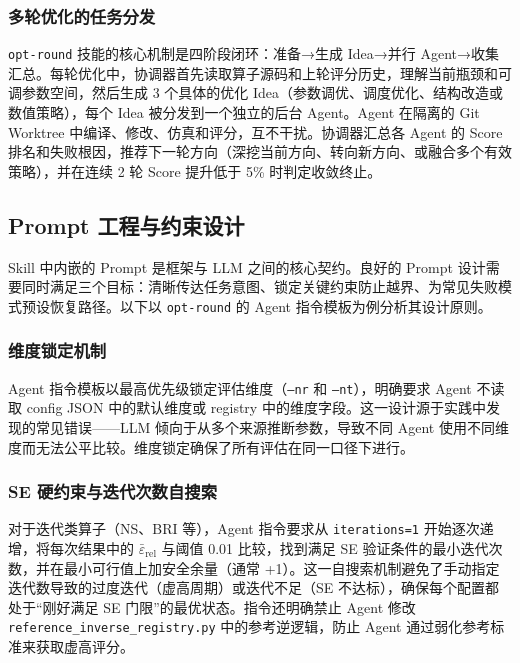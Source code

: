 \documentclass{CjC}
\begin{document}
\subsubsection{多轮优化的任务分发}

\texttt{opt-round} 技能的核心机制是四阶段闭环：准备→生成 Idea→并行 Agent→收集汇总。每轮优化中，协调器首先读取算子源码和上轮评分历史，理解当前瓶颈和可调参数空间，然后生成 3 个具体的优化 Idea（参数调优、调度优化、结构改造或数值策略），每个 Idea 被分发到一个独立的后台 Agent。Agent 在隔离的 Git Worktree 中编译、修改、仿真和评分，互不干扰。协调器汇总各 Agent 的 Score 排名和失败根因，推荐下一轮方向（深挖当前方向、转向新方向、或融合多个有效策略），并在连续 2 轮 Score 提升低于 5\% 时判定收敛终止。

\subsection{Prompt 工程与约束设计}

Skill 中内嵌的 Prompt 是框架与 LLM 之间的核心契约。良好的 Prompt 设计需要同时满足三个目标：清晰传达任务意图、锁定关键约束防止越界、为常见失败模式预设恢复路径。以下以 \texttt{opt-round} 的 Agent 指令模板为例分析其设计原则。

\subsubsection{维度锁定机制}

Agent 指令模板以最高优先级锁定评估维度（\texttt{--nr} 和 \texttt{--nt}），明确要求 Agent 不读取 config JSON 中的默认维度或 registry 中的维度字段。这一设计源于实践中发现的常见错误——LLM 倾向于从多个来源推断参数，导致不同 Agent 使用不同维度而无法公平比较。维度锁定确保了所有评估在同一口径下进行。

\subsubsection{SE 硬约束与迭代次数自搜索}

对于迭代类算子（NS、BRI 等），Agent 指令要求从 \texttt{iterations=1} 开始逐次递增，将每次结果中的 $\bar{\varepsilon}_{\text{rel}}$ 与阈值 0.01 比较，找到满足 SE 验证条件的最小迭代次数，并在最小可行值上加安全余量（通常 +1）。这一自搜索机制避免了手动指定迭代数导致的过度迭代（虚高周期）或迭代不足（SE 不达标），确保每个配置都处于``刚好满足 SE 门限''的最优状态。指令还明确禁止 Agent 修改 \texttt{reference\_inverse\_registry.py} 中的参考逆逻辑，防止 Agent 通过弱化参考标准来获取虚高评分。
\end{document}
